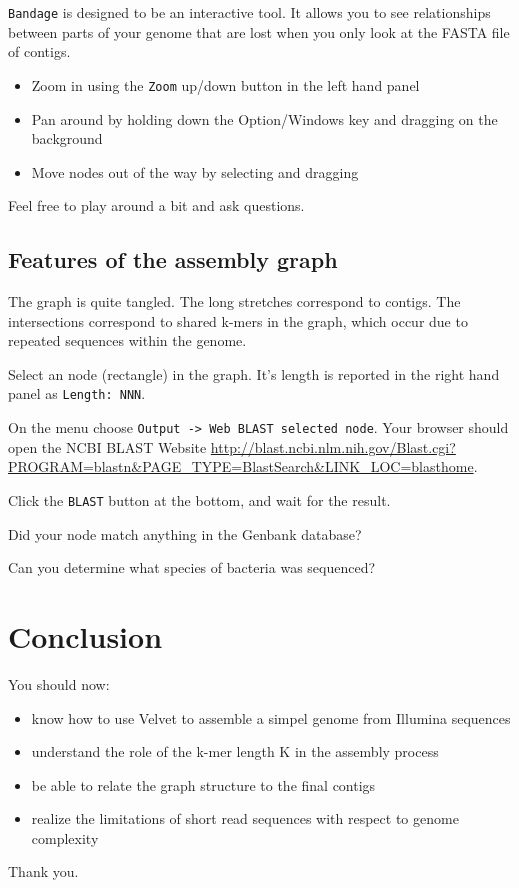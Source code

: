 \texttt{Bandage} is designed to be an interactive tool. It allows you to see relationships between parts of your genome that are lost when you only look at the FASTA file of contigs.
\begin{itemize}
\item Zoom in using the \texttt{Zoom} up/down button in the left hand panel
\item Pan around by holding down the Option/Windows key and dragging on the background
\item Move nodes out of the way by selecting and dragging
\end{itemize}
Feel free to play around a bit and ask questions.

\subsection{Features of the assembly graph}
The graph is quite tangled. The long stretches correspond to contigs. The intersections correspond to shared k-mers in the graph, which occur due to repeated sequences within the genome.
\begin{steps}
\item Select an node (rectangle) in the graph. It's length is reported in the right hand panel as \texttt{Length: NNN}.
\item On the menu choose \texttt{Output -> Web BLAST selected node}. Your browser should open the
   NCBI BLAST Website \url{http://blast.ncbi.nlm.nih.gov/Blast.cgi?PROGRAM=blastn&PAGE_TYPE=BlastSearch&LINK_LOC=blasthome}.
\item Click the \texttt{BLAST} button at the bottom, and wait for the result.
\end{steps}

\begin{questions}
Did your node match anything in the Genbank database?
\begin{answer}
\end{answer}
Can you determine what species of bacteria was sequenced?
\begin{answer}
\end{answer}
\end{questions}

\section{Conclusion}
You should now:
\begin{itemize}
\item know how to use Velvet to assemble a simpel genome from Illumina sequences
\item understand the role of the k-mer length K in the assembly process
\item be able to relate the graph structure to the final contigs
\item realize the limitations of short read sequences with respect to genome complexity
\end{itemize}
Thank you.
